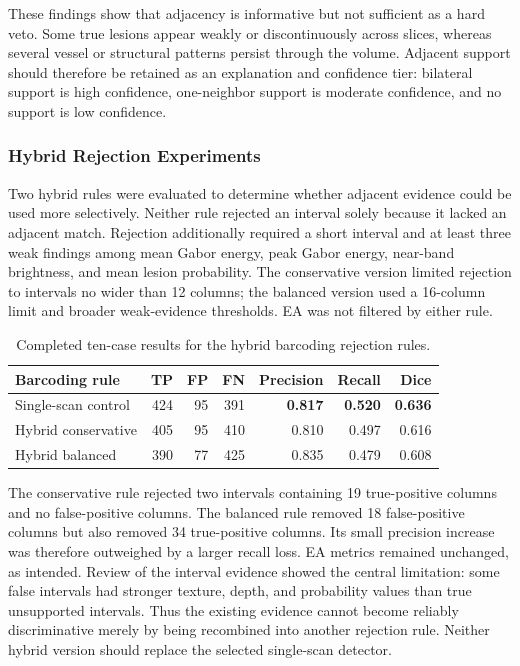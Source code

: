 \documentclass[11pt]{article}
\begin{document}
These findings show that adjacency is informative but not sufficient as a
hard veto.  Some true lesions appear weakly or discontinuously across slices,
whereas several vessel or structural patterns persist through the volume.
Adjacent support should therefore be retained as an explanation and confidence
tier: bilateral support is high confidence, one-neighbor support is moderate
confidence, and no support is low confidence.

\subsubsection{Hybrid Rejection Experiments}

Two hybrid rules were evaluated to determine whether adjacent evidence could
be used more selectively.  Neither rule rejected an interval solely because
it lacked an adjacent match.  Rejection additionally required a short interval
and at least three weak findings among mean Gabor energy, peak Gabor energy,
near-band brightness, and mean lesion probability.  The conservative version
limited rejection to intervals no wider than 12 columns; the balanced version
used a 16-column limit and broader weak-evidence thresholds.  EA was not
filtered by either rule.

\begin{table}[H]
\centering
\small
\begin{tabular}{lrrrrrr}
\toprule
\textbf{Barcoding rule} & \textbf{TP} & \textbf{FP} & \textbf{FN} &
\textbf{Precision} & \textbf{Recall} & \textbf{Dice} \\
\midrule
Single-scan control & 424 & 95 & 391 & \textbf{0.817} & \textbf{0.520} & \textbf{0.636} \\
Hybrid conservative & 405 & 95 & 410 & 0.810 & 0.497 & 0.616 \\
Hybrid balanced & 390 & 77 & 425 & 0.835 & 0.479 & 0.608 \\
\bottomrule
\end{tabular}
\caption{Completed ten-case results for the hybrid barcoding rejection rules.}
\label{tab:hybrid_experiments}
\end{table}

The conservative rule rejected two intervals containing 19 true-positive
columns and no false-positive columns.  The balanced rule removed 18
false-positive columns but also removed 34 true-positive columns.  Its small
precision increase was therefore outweighed by a larger recall loss.  EA
metrics remained unchanged, as intended.  Review of the interval evidence
showed the central limitation: some false intervals had stronger texture,
depth, and probability values than true unsupported intervals.  Thus the
existing evidence cannot become reliably discriminative merely by being
recombined into another rejection rule.  Neither hybrid version should replace
the selected single-scan detector.
\end{document}
